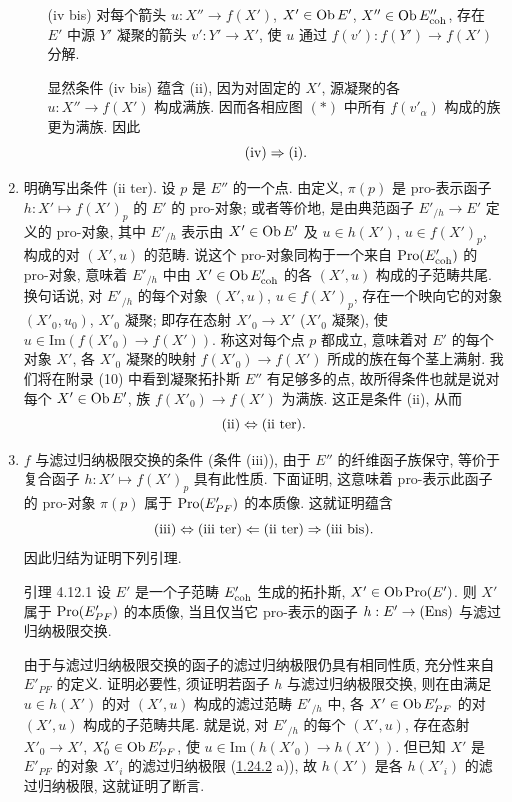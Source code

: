\begin{enumerate}
\begin{itemize}
\item[(iv bis)] 对每个箭头 $u : X''\to f(X')$,
$X'\in \Ob E'$, $X''\in \Ob E''_{\coh}$,
存在 $E'$ 中源 $Y'$ 凝聚的箭头 $v' : Y'\to X'$,
使 $u$ 通过 $f(v') : f(Y') \to f(X')$ 分解.

显然条件 (iv bis) 蕴含 (ii),
因为对固定的 $X'$, 源凝聚的各 $u : X''\to f(X')$ 构成满族.
因而各相应图 $(\ast)$ 中所有 $f(v'_{\alpha})$ 构成的族更为满族.
因此
$$
{\rm(iv)} \Rightarrow {\rm(i)}{\quoi}.
$$
\end{itemize}

\item 明确写出条件 (ii ter).
设 $p$ 是 $E''$ 的一个点.
由定义, $\pi(p)$ 是 pro-表示函子
$h : X'\longmapsto f(X')_{p}$ 的 $E'$ 的 pro-对象;
或者等价地, 是由典范函子 $E'_{/h} \to E'$ 定义的 pro-对象,
其中 $E'_{/h}$ 表示由 $X'\in \Ob E'$ 及 $u\in h(X')$,
\ie $u\in f(X')_p$, 构成的对 $(X',u)$ 的范畴.
说这个 pro-对象同构于一个来自 $\operatorname{Pro}(E'_{\mathrm{coh}})$ 的 pro-对象,
意味着 $E'_{/h}$ 中由 $X'\in\operatorname{Ob} E'_{\mathrm{coh}}$ 的各 $(X',u)$
构成的子范畴共尾.
换句话说, 对 $E'_{/h}$ 的每个对象 $(X',u)$,
$u\in f(X')_p$,
存在一个映向它的对象 $(X'_0,u_0)$, $X'_0$ 凝聚;
即存在态射 $X'_0\to X'$ ($X'_0$ 凝聚),
使 $u\in\text{Im}(f(X'_0)\to f(X'))$.
称这对每个点 $p$ 都成立,
意味着对 $E'$ 的每个对象 $X'$,
各 $X'_0$ 凝聚的映射 $f(X'_0)\to f(X')$ 所成的族在每个茎上满射.
我们将在附录 (10) 中看到凝聚拓扑斯 $E''$ 有足够多的点,
故所得条件也就是说对每个 $X'\in\Ob E'$,
族 $f(X'_0)\to f(X')$ 为满族.
这正是条件 (ii), 从而
$$
{\rm(ii)} \Leftrightarrow \text{(ii ter)}{}.
$$

\item $f$ 与滤过归纳极限交换的条件\pageoriginale{}
(条件 (iii)),
由于 $E''$ 的纤维函子族保守,
等价于复合函子 $h : X'\longmapsto f(X')_p$ 具有此性质.
下面证明, 这意味着 pro-表示此函子的 pro-对象 $\pi(p)$
属于 $\operatorname{Pro}(E'_{PF})$ 的本质像.
这就证明蕴含
$$
{\rm(iii)} \Leftrightarrow \text{(iii ter)} \Leftarrow \text{(ii ter)}
\Rightarrow \text{(iii bis)}{}.
$$
因此归结为证明下列引理.

\begin{enonce*}{引理 4.12.1}
设 $E'$ 是一个子范畴 $E'_{\mathrm{coh}}$ 生成的拓扑斯,
$X' \in \operatorname{Ob} \operatorname{Pro}(E')$.
则 $X'$ 属于 $\operatorname{Pro}(E'_{PF})$ 的本质像,
当且仅当它 pro-表示的函子
$h : E'\to (\Ens)$ 与滤过归纳极限交换.
\end{enonce*}

由于与滤过归纳极限交换的函子的滤过归纳极限仍具有相同性质,
充分性来自 $E'_{PF}$ 的定义.
证明必要性, 须证明若函子 $h$ 与滤过归纳极限交换,
则在由满足 $u\in h(X')$ 的对 $(X',u)$ 构成的滤过范畴 $E'_{/h}$ 中,
各 $X'\in\operatorname{Ob} E'_{PF}$ 的对 $(X',u)$ 构成的子范畴共尾.
就是说, 对 $E'_{/h}$ 的每个 $(X',u)$,
存在态射 $X'_0\to X'$, $X'_0\in\operatorname{Ob} E'_{PF}$,
使 $u\in\text{Im}(h(X'_0)\to h(X'))$.\pageoriginale{}
但已知 $X'$ 是 $E'_{PF}$ 的对象 $X'_i$ 的滤过归纳极限
(\hyperref[VI.cor1.24.2]{1.24.2} a)),
故 $h(X')$ 是各 $h(X'_i)$ 的滤过归纳极限,
这就证明了断言.


\end{enumerate}
